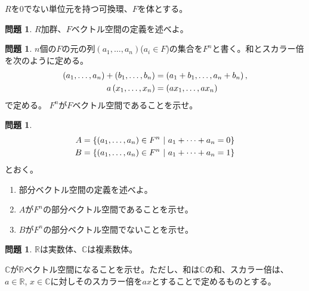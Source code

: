 \documentclass[uplatex]{jsarticle}
\theoremstyle{definition}
\numberwithin{equation}{section}
\newtheorem{prob}[section]{問題}
\newcommand{\midbar}{\ \middle| \ }
\newcommand{\R}{\mathbb{R}}
\newcommand{\C}{\mathbb{C}}
\begin{document}
$R$を0でない単位元を持つ可換環、$F$を体とする。
\begin{prob}
  $R$加群、$F$ベクトル空間の定義を述べよ。
\end{prob}

\begin{prob}
  $n$個の$F$の元の列$\left( a_1,\dots, a_n \right)$($a_i\in F$)の集合を$F^n$と書く。和とスカラー倍を次のように定める。
  \begin{align}
\left( a_1,\dots, a_n \right) + \left( b_1,\dots, b_n \right) &= \left(a_1 + b_1,\dots, a_n + b_n \right), \notag \\
  a\left( x_1,\dots, x_n \right) &= \left(ax_1,\dots, ax_n \right) \notag
\end{align}
で定める。
  $F^n$が$F$ベクトル空間であることを示せ。
\end{prob}

\begin{prob}
  \begin{align}
  A &= \left\{ (a_1,\dots, a_n) \in F^n \midbar a_1+\dots+a_n = 0 \right\} \notag \\
  B &= \left\{ (a_1,\dots, a_n) \in F^n \midbar a_1+\dots+a_n = 1 \right\} \notag
  \end{align}
  とおく。
  \begin{enumerate}
    \item 部分ベクトル空間の定義を述べよ。
    \item $A$が$F^n$の部分ベクトル空間であることを示せ。
    \item $B$が$F^n$の部分ベクトル空間でないことを示せ。
  \end{enumerate}
\end{prob}

\begin{prob}
  $\R$は実数体、$\C$は複素数体。

  $\C$が$\R$ベクトル空間になることを示せ。ただし、和は$\C$の和、スカラー倍は、$a\in\R$, $x\in \C$に対しそのスカラー倍を$ax$とすることで定めるものとする。
\end{prob}
\end{document}

